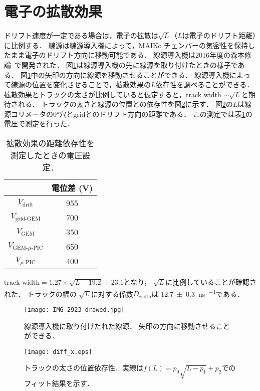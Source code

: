 \documentclass[../master]{subfiles}
\begin{document}
\section{電子の拡散効果}
ドリフト速度が一定である場合は，電子の拡散は$\sqrt{L}$（$L$は電子のドリフト距離）に比例する．
線源は線源導入機によって，MAIKo チェンバーの気密性を保持したまま電子のドリフト方向に移動可能である．
線源導入機は2016年度の森本修論~\cite{morimoto_thesis}で開発された．
図\ref{pic::source_insirtion}は線源導入機の先に線源を取り付けたときの様子である．
図\ref{pic::source_insirtion}中の矢印の方向に線源を移動させることができる．
線源導入機によって線源の位置を変化させることで，拡散効果の$L$依存性を調べることができる．
拡散効果とトラックの太さが比例していると仮定すると，track width $\sim\sqrt{L}$と期待される．
トラックの太さと線源の位置との依存性を図\ref{fig::diff_x}に示す．
図\ref{fig::diff_x}の$L$は線源コリメータの\ang{0}穴とgridとのドリフト方向の距離である．
この測定では表\ref{tab::config_diffusion_meas}の電圧で測定を行った．
\begin{table}
  \centering
  \caption{拡散効果の距離依存性を測定したときの電圧設定．}
  \label{tab::config_diffusion_meas}
  \begin{tabular}{cc}
    \toprule
    & 電位差 (\si{\volt}) \\
    \midrule
    $V_{\text{drift}}$ & 955 \\
    $V_{\text{grid-GEM}}$ & 700 \\
    $V_{\text{GEM}}$ & 350 \\
    $V_{\text{GEM-$\mu$-PIC}}$ & 650 \\
    $V_{\mu\text{-PIC}}$ & 400 \\
    \bottomrule
  \end{tabular}
\end{table}

$\text{track width} = 1.27\times\sqrt{L-19.2}+23.1$となり，
$\sqrt{L}$に比例していることが確認された．
トラックの幅の $\sqrt{L}$に対する係数$D_{\text{width}}$は
\SI{12.7\pm0.3}{\nano\second\per\sqrt{\milli\metre}}である．
\begin{figure}
  \centering
  \texttt{[image: IMG\_2923\_drawed.jpg]}
  \caption[線源導入機に取り付けたれた線源．]
          {線源導入機に取り付けたれた線源．
          矢印の方向に移動させることができる．}
  \label{pic::source_insirtion}
\end{figure}
\begin{figure}
  \centering
  \texttt{[image: diff\_x.eps]}
  \caption{トラックの太さの位置依存性．実線は$f(L) = p_{0}\sqrt{L-p_{1}}+p_{2}$でのフィット結果を示す．}
  \label{fig::diff_x}
\end{figure}
\end{document}
